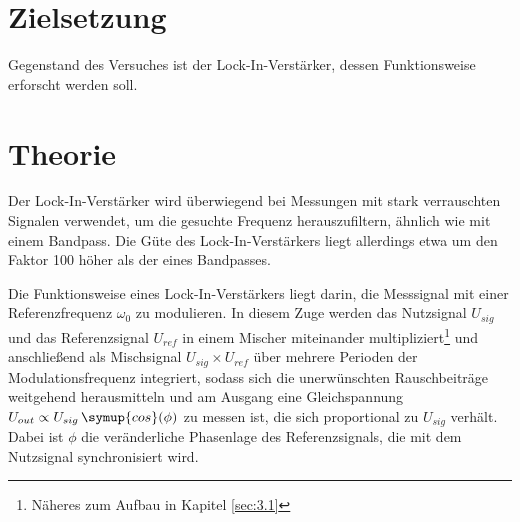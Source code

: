\maketitle
\tableofcontents
\newpage

\section{Zielsetzung}
Gegenstand des Versuches ist der Lock-In-Verstärker, dessen Funktionsweise
erforscht werden soll.

\section{Theorie}
\label{sec:2}
Der Lock-In-Verstärker wird überwiegend bei Messungen mit stark verrauschten Signalen
verwendet, um die gesuchte Frequenz herauszufiltern, ähnlich wie mit einem Bandpass.
Die Güte des Lock-In-Verstärkers liegt allerdings etwa um den Faktor 100 höher als
der eines Bandpasses.

Die Funktionsweise eines Lock-In-Verstärkers liegt darin,
die Messsignal mit einer Referenzfrequenz $\omega_0$ zu modulieren. In diesem Zuge
werden das Nutzsignal $U_ {sig}$ und das Referenzsignal $U_{ref}$ in einem Mischer
miteinander multipliziert\footnote{Näheres zum Aufbau in Kapitel \ref{sec:3.1}}
und anschließend als Mischsignal $U_{sig} \times U_{ref}$ über mehrere Perioden
der Modulationsfrequenz integriert, sodass sich die unerwünschten Rauschbeiträge
weitgehend herausmitteln und am Ausgang eine Gleichspannung $U_{out} \propto U_{sig} \,
\symup{cos}(\phi)$ zu messen ist, die sich proportional zu $U_{sig}$ verhält. Dabei
ist $\phi$ die veränderliche Phasenlage des Referenzsignals, die mit dem Nutzsignal synchronisiert
wird.


